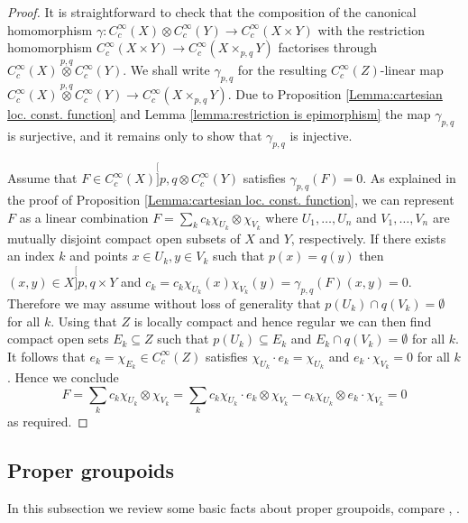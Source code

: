 \documentclass{amsart}
\newcommand{\ccinfty}{C_c^\infty}
\begin{document}
\begin{proof}
It is straightforward to check that the composition of the canonical homo\-morphism $ \gamma: \ccinfty(X) \otimes \ccinfty(Y) \rightarrow \ccinfty(X \times Y) $ with the restriction homomorphism $ \ccinfty(X \times Y) \rightarrow \ccinfty(X \times_{p,q} Y) $ factorises through $ \ccinfty(X) \stackrel{p,q}{\otimes }\ccinfty(Y) $. We shall write $ \gamma_{p,q} $ for the resulting $ \ccinfty(Z) $-linear map $ \ccinfty(X) \stackrel{p,q}{\otimes }\ccinfty(Y) \rightarrow \ccinfty(X \times_{p,q} Y) $. Due to Proposition \ref{Lemma:cartesian loc. const. function} and Lemma \ref{lemma:restriction is epimorphism} the map $ \gamma_{p,q} $ is surjective,  
and it remains only to show that $ \gamma_{p,q} $ is injective. 

Assume that $ F \in \ccinfty(X) \stackrel[]{p,q}{\otimes} \ccinfty(Y)$ satisfies $ \gamma_{p,q}(F) = 0 $. As explained in the proof of Proposition \ref{Lemma:cartesian loc. const. function}, we can represent $ F $ as a linear combination $ F = \sum_k c_k \chi_{U_k} \otimes \chi_{V_k} $ where $ U_1, \dots, U_n $ and $ V_1, \dots, V_n  $ are mutually disjoint compact open subsets of $ X $ and $ Y $, respectively. If there exists an index $ k $ and points $ x \in U_k, y \in V_k $ such that $ p(x) = q(y) $ then $ (x,y) \in X\stackrel[]{p, q}{\times} Y $ and $ c_k = c_k \chi_{U_k}(x) \chi_{V_k}(y) = \gamma_{p,q}(F)(x,y) = 0 $. 
Therefore we may assume without loss of generality that $ p(U_k) \cap q(V_k) = \emptyset $ for all $ k $. Using that $ Z $ is locally compact and hence regular we can then find compact open sets $ E_k \subseteq Z $ such that $ p(U_k) \subseteq E_k $ and $ E_k \cap q(V_k) = \emptyset $ for all $ k $. 
It follows that $ e_k = \chi_{E_k} \in \ccinfty(Z) $ satisfies $ \chi_{U_k} \cdot e_k = \chi_{U_k} $ and $ e_k \cdot \chi_{V_k} = 0 $ for all $ k $. Hence we conclude 
$$ 
F = \sum_k c_k \chi_{U_k} \otimes \chi_{V_k} = \sum_k c_k \chi_{U_k} \cdot e_k \otimes \chi_{V_k} - c_k \chi_{U_k} \otimes e_k \cdot \chi_{V_k} = 0 
$$ 
as required. 
\end{proof}


\subsection{Proper groupoids} 

In this subsection we review some basic facts about proper groupoids, compare \cite{RENAULT_groupoidapproach}, \cite{TU_novikovhyperbolique}.  
\end{document}
